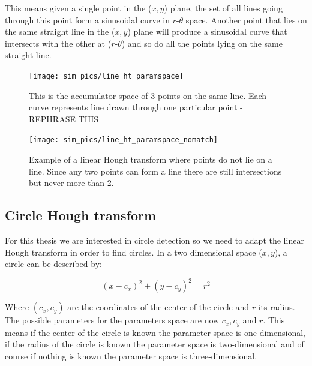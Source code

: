 \documentclass[11pt]{scrreprt}
\begin{document}
This means given a single point in the ($x,y$) plane, the set of all lines going through this point form a sinusoidal curve in 
$r\text{-}\theta$ space. Another point that lies on the same straight line in the ($x,y$) plane will produce a sinusoidal curve that 
intersects with the other at ($r\text{-}\theta$) and so do all the points lying on the same straight line. 


\begin{figure}[tb]
  \centering
  \texttt{[image: sim\_pics/line\_ht\_paramspace]}
  \caption[Example of a linear HT space]{This is the accumulator space of 3 points on the same line. Each curve represents line drawn through one particular point - REPHRASE THIS}
  \label{fig:line_ht}
\end{figure}

\begin{figure}[tb]
  \centering
  \texttt{[image: sim\_pics/line\_ht\_paramspace\_nomatch]}
  \caption[Example of a linear HT where points do not lie on a line]{Example of a linear Hough transform where points do not lie on a line. Since any 
  two points can form a line there are still intersections but never more than 2.}
  \label{fig:line_ht_nomatch}
\end{figure}

\subsection{Circle Hough transform} %
\label{sub:circle_hough_transform}

For this thesis we are interested in circle detection so we need to adapt the linear Hough transform in order to find circles. 
In a two dimensional space ($x,y$), a circle can be described by:

\begin{equation}
		(x-c_x)^2 + (y-c_y)^2 = r^2
\end{equation}

Where $(c_x,c_y)$ are the coordinates of the center of the circle and $r$ its radius. The possible parameters for the parameters space are now $c_x, c_y$ and $r$. This means if the center of the circle is known the parameter space is one-dimensional, if the radius of the circle is known the parameter space is two-dimensional and of course if nothing is known the parameter space is three-dimensional.



\end{document}
